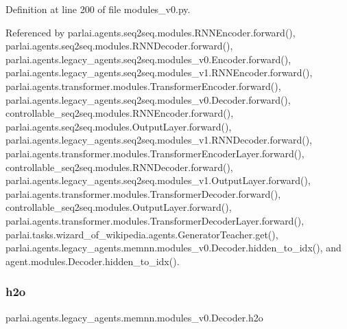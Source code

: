 Definition at line 200 of file modules\+\_\+v0.\+py.



Referenced by parlai.\+agents.\+seq2seq.\+modules.\+R\+N\+N\+Encoder.\+forward(), parlai.\+agents.\+seq2seq.\+modules.\+R\+N\+N\+Decoder.\+forward(), parlai.\+agents.\+legacy\+\_\+agents.\+seq2seq.\+modules\+\_\+v0.\+Encoder.\+forward(), parlai.\+agents.\+legacy\+\_\+agents.\+seq2seq.\+modules\+\_\+v1.\+R\+N\+N\+Encoder.\+forward(), parlai.\+agents.\+transformer.\+modules.\+Transformer\+Encoder.\+forward(), parlai.\+agents.\+legacy\+\_\+agents.\+seq2seq.\+modules\+\_\+v0.\+Decoder.\+forward(), controllable\+\_\+seq2seq.\+modules.\+R\+N\+N\+Encoder.\+forward(), parlai.\+agents.\+seq2seq.\+modules.\+Output\+Layer.\+forward(), parlai.\+agents.\+legacy\+\_\+agents.\+seq2seq.\+modules\+\_\+v1.\+R\+N\+N\+Decoder.\+forward(), parlai.\+agents.\+transformer.\+modules.\+Transformer\+Encoder\+Layer.\+forward(), controllable\+\_\+seq2seq.\+modules.\+R\+N\+N\+Decoder.\+forward(), parlai.\+agents.\+legacy\+\_\+agents.\+seq2seq.\+modules\+\_\+v1.\+Output\+Layer.\+forward(), parlai.\+agents.\+transformer.\+modules.\+Transformer\+Decoder.\+forward(), controllable\+\_\+seq2seq.\+modules.\+Output\+Layer.\+forward(), parlai.\+agents.\+transformer.\+modules.\+Transformer\+Decoder\+Layer.\+forward(), parlai.\+tasks.\+wizard\+\_\+of\+\_\+wikipedia.\+agents.\+Generator\+Teacher.\+get(), parlai.\+agents.\+legacy\+\_\+agents.\+memnn.\+modules\+\_\+v0.\+Decoder.\+hidden\+\_\+to\+\_\+idx(), and agent.\+modules.\+Decoder.\+hidden\+\_\+to\+\_\+idx().

\mbox{\label{classparlai_1_1agents_1_1legacy__agents_1_1memnn_1_1modules__v0_1_1Decoder_add594d5a2a241288c95a899b640b6aca}} 
\subsubsection{\texorpdfstring{h2o}{h2o}}
{\footnotesize\ttfamily parlai.\+agents.\+legacy\+\_\+agents.\+memnn.\+modules\+\_\+v0.\+Decoder.\+h2o}



